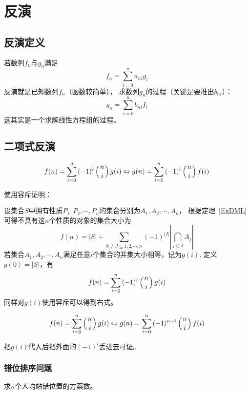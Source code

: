 \section{反演}
\subsection{反演定义}
若数列${f_n}$与${g_n}$满足
\begin{displaymath}
	f_n=\sum_{i=0}^n{a_{ni}g_i}
\end{displaymath}
反演就是已知数列${f_n}$（函数较简单），
求数列${g_n}$的过程（关键是要推出$b_{ni}$）：
\begin{displaymath}
	g_n=\sum_{i=0}^n{b_{ni}f_i}
\end{displaymath}
这其实是一个求解线性方程组的过程。
\subsection{二项式反演}\label{BI}
\begin{theorem}
	\begin{displaymath}
		f(n)=\sum_{i=0}^n{(-1)^i\left(n \atop i\right)g(i)}
		\Leftrightarrow g(n)=\sum_{i=0}^n{(-1)^i\left(n \atop i\right)f(i)}
	\end{displaymath}
\end{theorem}
使用容斥证明：

设集合$S$中拥有性质$P_1,P_2,\cdots,P_n$的集合分别为$A_1,A_2,\cdots,A_n$，
根据定理~\ref{ExDML}可得不具有这$n$个性质的对象的集合大小为
\begin{displaymath}
	f(n)=|S|+\sum_{\emptyset \neq J\subseteq{1,2,\cdots,n}}
	{(-1)^{|J|}\left|\bigcap_{j\in J}{A_j}\right|}
\end{displaymath}
若集合$A_1,A_2,\cdots,A_n$满足任意$i$个集合的并集大小相等，记为$g(i)$,
定义$g(0)=|S|$，有
\begin{displaymath}
	f(n)=\sum_{i=0}^n{(-1)^i \left(n \atop i\right)g(i)}
\end{displaymath}
同样对$g(i)$使用容斥可以得到右式。
\begin{inference}\label{BII}
	\begin{displaymath}
		f(n)=\sum_{i=0}^n{\left(n \atop i\right)g(i)}
		\Leftrightarrow g(n)=\sum_{i=0}^n{(-1)^{n-i}\left(n \atop i\right)f(i)}
	\end{displaymath}
\end{inference}
把$g(i)$代入后把外面的$(-1)^i$丢进去可证。
\subsubsection{错位排序问题}
求$n$个人均站错位置的方案数。

